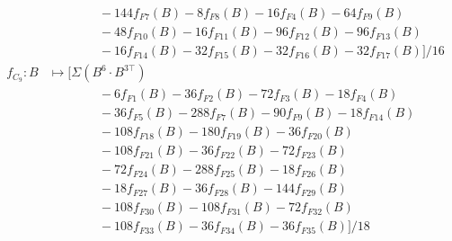 \documentclass{article}
\theoremstyle{plain}
\begin{document}
\begin{align*}
                                &\qquad\qquad-144f_{F7}(B)-8f_{F8}(B)-16f_{F4}(B)-64f_{F9}(B)\\
                                &\qquad\qquad-48f_{F10}(B)-16f_{F11}(B)-96f_{F12}(B)-96f_{F13}(B)\\
                                &\qquad\qquad-16f_{F14}(B)-32f_{F15}(B)-32f_{F16}(B)-32f_{F17}(B)]/16\\
        f_{C_9} : B&\mapsto [\Sigma(B^6\cdot B^{3\top})\\
                                &\qquad\qquad-6f_{F1}(B)-36f_{F2}(B)-72f_{F3}(B)-18f_{F4}(B)\\
                                &\qquad\qquad-36f_{F5}(B)-288f_{F7}(B)-90f_{F9}(B)-18f_{F14}(B)\\
                                &\qquad\qquad-108f_{F18}(B)-180f_{F19}(B)-36f_{F20}(B)\\
                                &\qquad\qquad-108f_{F21}(B)-36f_{F22}(B)-72f_{F23}(B)\\
                                &\qquad\qquad-72f_{F24}(B)-288f_{F25}(B)-18f_{F26}(B)\\
                                &\qquad\qquad-18f_{F27}(B)-36f_{F28}(B)-144f_{F29}(B)\\
                                &\qquad\qquad-108f_{F30}(B)-108f_{F31}(B)-72f_{F32}(B)\\
                                &\qquad\qquad-108f_{F33}(B)-36f_{F34}(B)-36f_{F35}(B)]/18
\end{align*}
%

\end{document}
